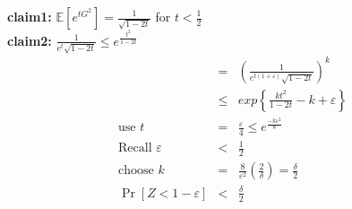 \documentclass[12pt]{article}
\begin{document}
\begin{enumerate}[align=left, labelwidth=1ex, start=1,label={Lemma \arabic*}]
	\textbf{claim1: } $\mathbb{E}\left[e^{tG^2}\right] = \frac1{\sqrt{1-2t}}$ for $t < \frac12$\\
	\textbf{claim2: } $\frac{1}{e^t\sqrt{1-2t}} \leq e^{\frac{t^2}{1-2t}}$ 
	\begin{eqnarray*}
	&=& \left(\frac{1}{e^{t(1+\varepsilon)}\sqrt{1-2t}}\right)^k\\
	&\leq& exp\left\{ \frac{kt^2}{1-2t} - k+\varepsilon\right\}\\
	\text{use } t &=& \frac{\varepsilon}{4} \leq e^{\frac{-k\varepsilon^2}{8}}\\
	\text{Recall } \varepsilon &<& \frac12\\
	\text{choose } k &=& \frac{8}{\varepsilon^2}\left(\frac{2}{\delta}\right) = \frac{\delta}{2}\\
	\Pr\left[Z < 1-\varepsilon\right] &<& \frac{\delta}{2}
	\end{eqnarray*}
\end{enumerate}
\end{document}
